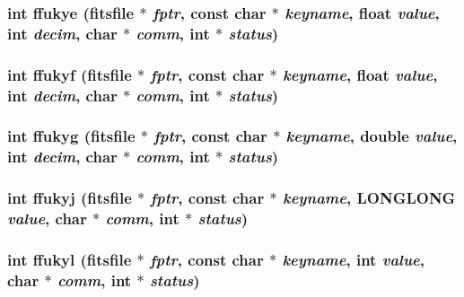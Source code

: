 \subsubsection{\setlength{\rightskip}{0pt plus 5cm}int ffukye (\bf{fitsfile} $\ast$ {\em fptr}, const char $\ast$ {\em keyname}, float {\em value}, int {\em decim}, char $\ast$ {\em comm}, int $\ast$ {\em status})}\label{test_2roimasker_2fitsio_8h_7d74546a4ae0316680f0d5b12899f2a5}


\subsubsection{\setlength{\rightskip}{0pt plus 5cm}int ffukyf (\bf{fitsfile} $\ast$ {\em fptr}, const char $\ast$ {\em keyname}, float {\em value}, int {\em decim}, char $\ast$ {\em comm}, int $\ast$ {\em status})}\label{test_2roimasker_2fitsio_8h_7e2a06ea877d0f925b262790562ddfee}


\subsubsection{\setlength{\rightskip}{0pt plus 5cm}int ffukyg (\bf{fitsfile} $\ast$ {\em fptr}, const char $\ast$ {\em keyname}, double {\em value}, int {\em decim}, char $\ast$ {\em comm}, int $\ast$ {\em status})}\label{test_2roimasker_2fitsio_8h_5a1f266c010c12d806f4ce4798d09899}


\subsubsection{\setlength{\rightskip}{0pt plus 5cm}int ffukyj (\bf{fitsfile} $\ast$ {\em fptr}, const char $\ast$ {\em keyname}, \bf{LONGLONG} {\em value}, char $\ast$ {\em comm}, int $\ast$ {\em status})}\label{test_2roimasker_2fitsio_8h_bafdc68a536acb7394eecdff9716469d}


\subsubsection{\setlength{\rightskip}{0pt plus 5cm}int ffukyl (\bf{fitsfile} $\ast$ {\em fptr}, const char $\ast$ {\em keyname}, int {\em value}, char $\ast$ {\em comm}, int $\ast$ {\em status})}\label{test_2roimasker_2fitsio_8h_87a441e58e003c3ffe935433f47fe619}


